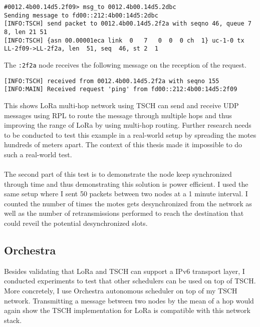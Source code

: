 \begin{lstlisting}[language=none]
#0012.4b00.14d5.2f09> msg_to 0012.4b00.14d5.2dbc
Sending message to fd00::212:4b00:14d5:2dbc
[INFO:TSCH] send packet to 0012.4b00.14d5.2f2a with seqno 46, queue 7 8, len 21 51
[INFO:TSCH] {asn 00.00001eca link  0   7   0  0  0 ch  1} uc-1-0 tx LL-2f09->LL-2f2a, len  51, seq  46, st 2  1
\end{lstlisting}

The \lstinline{:2f2a} node receives the following message on the reception of the
request.

\begin{lstlisting}[language=none]
[INFO:TSCH] received from 0012.4b00.14d5.2f2a with seqno 155
[INFO:MAIN] Received request 'ping' from fd00::212:4b00:14d5:2f09
\end{lstlisting}

This shows LoRa multi-hop network using TSCH can send and receive UDP messages
using RPL to route the message through multiple hops and thus improving the
range of LoRa by using multi-hop routing.
Further research needs to be conducted to test this example in a real-world
setup by spreading the motes hundreds of meters apart.
The context of this thesis made it impossible to do such a real-world test.

\paragraph{}

The second part of this test is to demonstrate the node keep synchronized
through time and thus demonstrating this solution is power efficient.
I used the same setup where I sent 50 packets between two nodes at a 1 minute
interval. I counted the number of times the motes gets desynchronized from the
network as well as the number of retransmissions performed to reach the
destination that could reveil the potential desynchronized slots.

\subsection{Orchestra\label{section:tschorchestra}}

Besides validating that LoRa and TSCH can support a IPv6 transport
layer, I conducted experiments to test that other schedulers can be used on top
of TSCH. More concretely, I use Orchestra autonomous scheduler on top of my TSCH network.
Transmitting a message between two nodes by the mean of a hop would again show
the TSCH implementation for LoRa is compatible with this network stack.

